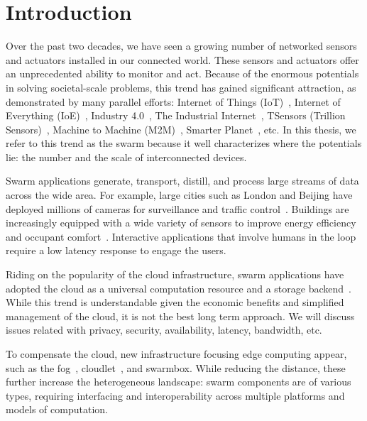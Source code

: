 \documentclass[thesis.tex]{subfiles}
\begin{document}
\chapter{Introduction}

Over the past two decades, we have seen a growing number of networked sensors
and actuators installed in our connected world. These sensors and actuators
offer an unprecedented ability to monitor and act. Because of the enormous
potentials in solving societal-scale problems, this trend has gained significant
attraction, as demonstrated by many parallel efforts: Internet of Things
(IoT)~\cite{atzori2010internet}, Internet of Everything
(IoE)~\cite{bradley2013internet}, Industry 4.0~\cite{lasi2014industry}, The
Industrial Internet~\cite{eigner2018industrial}, TSensors (Trillion
Sensors)~\cite{bogue2014towards}, Machine to Machine
(M2M)~\cite{anton2014machine}, Smarter Planet~\cite{palmisano2008smarter},
etc. In this thesis, we refer to this trend as the swarm because it well
characterizes where the potentials lie: the number and the scale of
interconnected devices.

Swarm applications generate, transport, distill, and process large streams of
data across the wide area. For example, large cities such as London and Beijing
have deployed millions of cameras for surveillance and traffic
control~\cite{skynet, london.surveillance}. Buildings are increasingly equipped
with a wide variety of sensors to improve energy efficiency and occupant
comfort~\cite{dawson2010smap, krioukov2012building}. Interactive applications
that involve humans in the loop require a low latency response to engage the
users.

Riding on the popularity of the cloud infrastructure, swarm applications have
adopted the cloud as a universal computation resource and a storage
backend~\cite{carriots, grovestreams, sami, xively, gupta2014bolt,
  zachariah1001internet}. While this trend is understandable given the economic
benefits and simplified management of the cloud, it is not the best long term
approach. We will discuss issues related with privacy, security, availability,
latency, bandwidth, etc.

To compensate the cloud, new infrastructure focusing edge computing appear, such
as the fog~\cite{bonomi2012fog, bar2013fog}, cloudlet~\cite{ha2014towards,
  satyanarayanan2009case, chen2018application}, and swarmbox. While reducing the
distance, these further increase the heterogeneous landscape: swarm components
are of various types, requiring interfacing and interoperability across multiple
platforms and models of computation.
\end{document}
